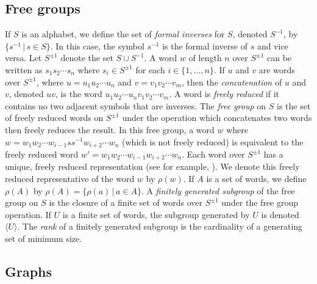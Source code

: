 \documentclass{article}
\newcommand{\gen}[1]{\langle #1 \rangle}
\newcommand{\Spm}{S^{\pm1}}
\begin{document}
\subsection{Free groups}

If $S$ is an alphabet, we define the set of \emph{formal inverses} for $S$, denoted $S^{-1}$, by $\{ s^{-1} \,|\, s \in S \}$.
In this case, the symbol $s^{-1}$ is the formal inverse of $s$ and vice versa.
Let $\Spm$ denote the set $S \cup S^{-1}$.
A word $w$ of length $n$ over $\Spm$ can be written as $s_1s_2\cdots s_n$ where $s_i \in \Spm$ for each $i \in \{1, \dotsc, n\}$.
If $u$ and $v$ are words over $\Spm$, where $u = u_1 u_2 \dotsb u_n$ and $v = v_1 v_2 \dotsb v_m$, then the \emph{concatenation} of $u$ and $v$, denoted $uv$, is the word $u_1 u_2 \cdots u_n v_1 v_2 \cdots v_m$.
A word is \emph{freely reduced} if it contains no two adjacent symbols that are inverses.
The \emph{free group} on $S$ is the set of freely reduced words on $\Spm$ under the operation which concatenates two words then freely reduces the result.
In this free group, a word $w$ where $w = w_1 w_2 \cdots w_{i - 1} s s^{-1} w_{i + 2} \cdots w_n$ (which is not freely reduced) is equivalent to the freely reduced word $w' = w_1 w_2 \cdots w_{i - 1} w_{i + 2} \cdots w_n$.
Each word over $\Spm$ has a unique, freely reduced representation (see for example, \cite[Section~I.1]{ls77}).
We denote this freely reduced representative of the word $w$ by $\rho(w)$.
If $A$ is a set of words, we define $\rho(A)$ by $\rho(A) = \{ \rho(a) \, | \, a \in A\}$.
A \emph{finitely generated subgroup} of the free group on $S$ is the closure of a finite set of words over $\Spm$ under the free group operation.
If $U$ is a finite set of words, the subgroup generated by $U$ is denoted $\gen{U}$.
The \emph{rank} of a finitely generated subgroup is the cardinality of a generating set of minimum size.

\subsection{Graphs}
\end{document}
